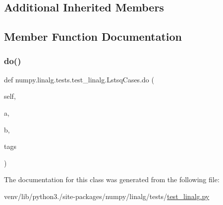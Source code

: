 \subsection*{Additional Inherited Members}


\subsection{Member Function Documentation}
\mbox{\label{classnumpy_1_1linalg_1_1tests_1_1test__linalg_1_1LstsqCases_afb7447b71d3b4689fe627975153c3065}} 
\subsubsection{\texorpdfstring{do()}{do()}}
{\footnotesize\ttfamily def numpy.\+linalg.\+tests.\+test\+\_\+linalg.\+Lstsq\+Cases.\+do (\begin{DoxyParamCaption}\item[{}]{self,  }\item[{}]{a,  }\item[{}]{b,  }\item[{}]{tags }\end{DoxyParamCaption})}



The documentation for this class was generated from the following file\+:\begin{DoxyCompactItemize}
\item 
venv/lib/python3./site-\/packages/numpy/linalg/tests/\hyperlink{test__linalg_8py}{test\+\_\+linalg.\+py}\end{DoxyCompactItemize}
